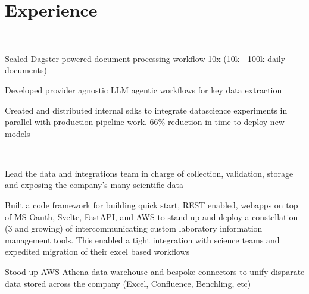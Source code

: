 \documentclass[a4paper]{deedy-resume-openfont} %
\begin{document}
\begin{minipage}[t]{0.66\textwidth} %


\section{Experience}

\\

\vspace{\topsep}
\begin{tightitemize}
    \item Scaled Dagster powered document processing workflow 10x (10k - 100k daily documents) 
    \item Developed provider agnostic LLM agentic workflows for key data extraction
    \item Created and distributed internal sdks to integrate datascience experiments in parallel with production pipeline work. 66\% reduction in time to deploy new models
\end{tightitemize}

\\

\begin{tightitemize}
    \item Lead the data and integrations team in charge of collection, validation, storage and exposing the company's many scientific data
    \item Built a code framework for building quick start, REST enabled, webapps on top of MS Oauth, Svelte, FastAPI, and AWS to stand up and deploy a constellation (3 and growing) of intercommunicating custom laboratory information management tools. This enabled a tight integration with science teams and expedited migration of their excel based workflows
    \item Stood up AWS Athena data warehouse and bespoke connectors to unify disparate data stored across the company (Excel, Confluence, Benchling, etc) 
\end{tightitemize}


\end{minipage}
\end{document}
